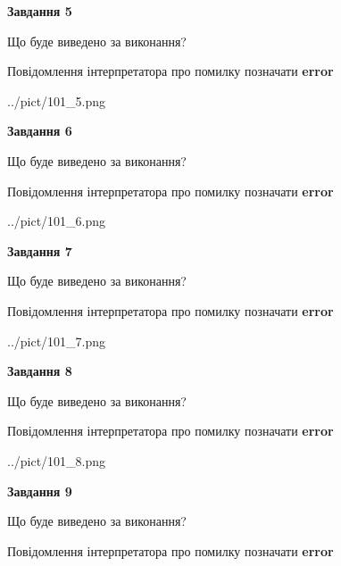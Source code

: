 \documentclass[11pt, ukrainian]{article}
\begin{document}
{\begin {large}
{\begin {center}\textbf{Завдання 5}\end {center}}\par
Що буде виведено за виконання? \par
Повідомлення інтерпретатора про помилку позначати \textbf{error}

\begin{center}
	{../pict/101_5.png}
\end{center}
\newpage

{\begin {center}\textbf{Завдання 6}\end {center}}\par
Що буде виведено за виконання? \par
Повідомлення інтерпретатора про помилку позначати \textbf{error}

\begin{center}
	{../pict/101_6.png}
\end{center}
\newpage

{\begin {center}\textbf{Завдання 7}\end {center}}\par
Що буде виведено за виконання? \par
Повідомлення інтерпретатора про помилку позначати \textbf{error}

\begin{center}
	{../pict/101_7.png}
\end{center}
\newpage

{\begin {center}\textbf{Завдання 8}\end {center}}\par
Що буде виведено за виконання? \par
Повідомлення інтерпретатора про помилку позначати \textbf{error}

\begin{center}
	{../pict/101_8.png}
\end{center}
\newpage

{\begin {center}\textbf{Завдання 9}\end {center}}\par
Що буде виведено за виконання? \par
Повідомлення інтерпретатора про помилку позначати \textbf{error}


\end{large}}
\end{document}
